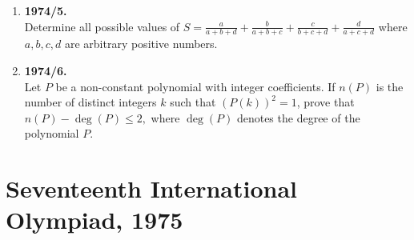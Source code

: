 \documentclass{article}
\begin{document}
\begin{enumerate}
\bigskip

\item\textbf{1974/5.} \\
Determine all possible values of
$
S = \frac{a}{a+b+d} + \frac{b}{a+b+c} + \frac{c}{b+c+d} + \frac{d}{a+c+d}
$
where $a, b, c, d$ are arbitrary positive numbers.

\bigskip

\item\textbf{1974/6.} \\
Let $P$ be a non-constant polynomial with integer coefficients. If $n(P)$ is the number of distinct integers $k$ such that $(P(k))^2 = 1$, prove that
$
n(P) - \deg(P) \leq 2,
$
where $\deg(P)$ denotes the degree of the polynomial $P$.
\end{enumerate}

\section*{Seventeenth International Olympiad, 1975}
\end{document}
